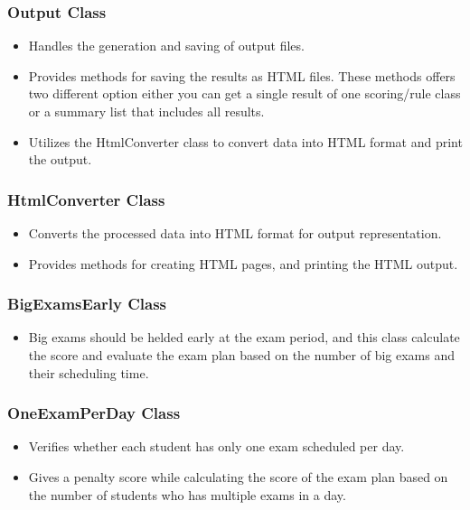 \subsubsection{Output Class}


\begin{itemize}
\item Handles the generation and saving of output files.
\item Provides methods for saving the results as HTML files. These methods offers two different option either you can get a single result of one scoring/rule class or a summary list that includes all results.
\item Utilizes the HtmlConverter class to convert data into HTML format and print the output.
\end{itemize}


\subsubsection{HtmlConverter Class}


\begin{itemize}
\item Converts the processed data into HTML format for output representation.
\item Provides methods for creating HTML pages, and printing the HTML output.

\end{itemize}


\subsubsection{BigExamsEarly Class}


\begin{itemize}
\item Big exams should be helded early at the exam period, and this class calculate the score and evaluate the exam plan based on the number of big exams and their scheduling time.
\end{itemize}


\subsubsection{OneExamPerDay Class}


\begin{itemize}
\item Verifies whether each student has only one exam scheduled per day.
\item Gives a penalty score while calculating the score of the exam plan based on the number of students who has multiple exams in a day.
\end{itemize}

